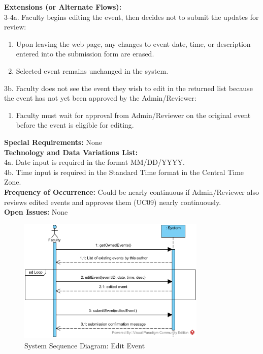 \documentclass{article}
\begin{document}
\textbf{Extensions (or Alternate Flows):} \\
3-4a. Faculty begins editing the event, then decides not to submit the updates for review:
\begin{enumerate}
    \item Upon leaving the web page, any changes to event date, time, or description entered into the submission form are erased.
    \item Selected event remains unchanged in the system.
\end{enumerate}
3b. Faculty does not see the event they wish to edit in the returned list because the event has not yet been approved by the Admin/Reviewer:
    \begin{enumerate}
        \item Faculty must wait for approval from Admin/Reviewer on the original event before the event is eligible for editing.
    \end{enumerate}
\textbf{Special Requirements:} None \\
\textbf{Technology and Data Variations List:} \\
4a. Date input is required in the format MM/DD/YYYY. \\
4b. Time input is required in the Standard Time format in the Central Time Zone. \\
\textbf{Frequency of Occurrence:} Could be nearly continuous if Admin/Reviewer also reviews edited events and approves them (UC09) nearly continuously. \\
\textbf{Open Issues:} None \\

\begin{figure}[H]
    \centering
    \includegraphics[width=0.8\textwidth]{images/SSD-UC05-EditEvent.png}
    \centering
    \caption{System Sequence Diagram: Edit Event}
\end{figure}
\end{document}
